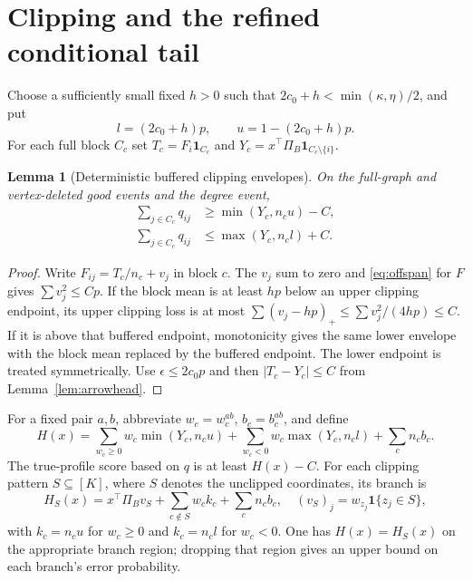 \documentclass[11pt]{article}
\newtheorem{lemma}[theorem]{Lemma}
\newcommand{\one}{\mathbf 1}
\begin{document}
\section{Clipping and the refined conditional tail}
Choose a sufficiently small fixed $h>0$ such that $2c_0+h<\min(\kappa,\eta)/2$, and put
\[
 l=(2c_0+h)p,\qquad u=1-(2c_0+h)p.
\]
For each full block $C_c$ set $T_c=F_i\one_{C_c}$ and $Y_c=x^\top\Pi_B\one_{C_c\setminus\{i\}}$.

\begin{lemma}[Deterministic buffered clipping envelopes]\label{lem:clip}
On the full-graph and vertex-deleted good events and the degree event,
\begin{align*}
 \sum_{j\in C_c}q_{ij}&\ge\min(Y_c,n_cu)-C,\\
 \sum_{j\in C_c}q_{ij}&\le\max(Y_c,n_cl)+C.
\end{align*}
\end{lemma}
\begin{proof}
Write $F_{ij}=T_c/n_c+v_j$ in block $c$. The $v_j$ sum to zero and \eqref{eq:offspan} for $F$ gives $\sum v_j^2\le Cp$. If the block mean is at least $hp$ below an upper clipping endpoint, its upper clipping loss is at most $\sum(v_j-hp)_+\le\sum v_j^2/(4hp)\le C$. If it is above that buffered endpoint, monotonicity gives the same lower envelope with the block mean replaced by the buffered endpoint. The lower endpoint is treated symmetrically. Use $\epsilon\le2c_0p$ and then $|T_c-Y_c|\le C$ from Lemma~\ref{lem:arrowhead}.
\end{proof}

For a fixed pair $a,b$, abbreviate $w_c=w_c^{ab}$, $b_c=b_c^{ab}$, and define
\[
 H(x)=\sum_{w_c\ge0}w_c\min(Y_c,n_cu)
       +\sum_{w_c<0}w_c\max(Y_c,n_cl)+\sum_cn_cb_c.
\]
The true-profile score based on $q$ is at least $H(x)-C$. For each clipping pattern $S\subseteq[K]$, where $S$ denotes the unclipped coordinates, its branch is
\[
 H_S(x)=x^\top\Pi_B v_S+\sum_{c\notin S}w_ck_c+\sum_cn_cb_c,
 \quad (v_S)_j=w_{z_j}\one\{z_j\in S\},
\]
with $k_c=n_cu$ for $w_c\ge0$ and $k_c=n_cl$ for $w_c<0$. One has $H(x)=H_S(x)$ on the appropriate branch region; dropping that region gives an upper bound on each branch's error probability.
\end{document}
